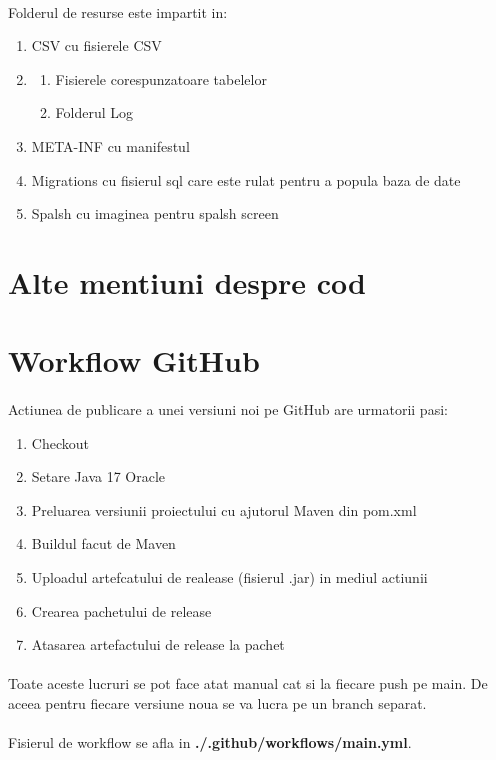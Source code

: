 \documentclass[oneside]{article}
\begin{document}
\paragraph{}Folderul de resurse este impartit in:
\begin{enumerate}
    \item CSV cu fisierele CSV
    \item \begin{enumerate}
        \item Fisierele corespunzatoare tabelelor
        \item Folderul Log
    \end{enumerate}
    \item META-INF cu manifestul
    \item Migrations cu fisierul sql care este rulat pentru a popula baza de date
    \item Spalsh cu imaginea pentru spalsh screen
\end{enumerate}

\section[Alte mentiuni despre cod]{Alte mentiuni despre cod}

\section[Workflow GitHub]{Workflow GitHub}
\paragraph{} Actiunea de publicare a unei versiuni noi pe GitHub are urmatorii pasi:
\begin{enumerate}
    \item Checkout
    \item Setare Java 17 Oracle
    \item Preluarea versiunii proiectului cu ajutorul Maven din pom.xml
    \item Buildul facut de Maven
    \item Uploadul artefcatului de realease (fisierul .jar) in mediul actiunii
    \item Crearea pachetului de release
    \item Atasarea artefactului de release la pachet
\end{enumerate}

\paragraph{} Toate aceste lucruri se pot face atat manual cat si la fiecare push pe main. De aceea pentru fiecare versiune noua se va lucra pe un branch separat.

\paragraph{} Fisierul de workflow se afla in \textbf{./.github/workflows/main.yml}.
\end{document}
